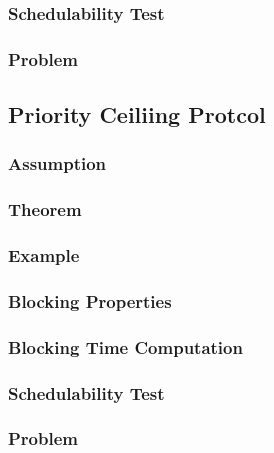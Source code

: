 \subsubsection{Schedulability Test}
\subsubsection{Problem}

\subsection{Priority Ceiliing Protcol}
\subsubsection{Assumption}
\subsubsection{Theorem}
\subsubsection{Example}
\subsubsection{Blocking Properties}
\subsubsection{Blocking Time Computation}
\subsubsection{Schedulability Test}
\subsubsection{Problem}